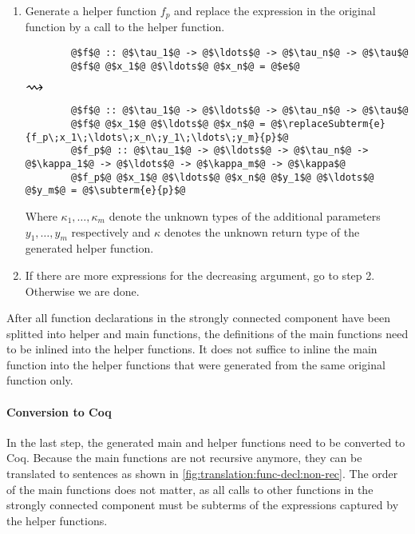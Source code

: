 \begin{enumerate}
  \item
  Generate a helper function $f_p$ and replace the  expression in the original function by a call to the helper function.
  \begin{center}
    \begin{minipage}[t]{0.3\textwidth}
      \begin{verbatim}
        @$f$@ :: @$\tau_1$@ -> @$\ldots$@ -> @$\tau_n$@ -> @$\tau$@
        @$f$@ @$x_1$@ @$\ldots$@ @$x_n$@ = @$e$@
      \end{verbatim}
    \end{minipage}
    \begin{minipage}[c]{0.05\textwidth}
      $\mathlarger{\mathlarger{\mathlarger{\rightsquigarrow}}}$
    \end{minipage}
    \begin{minipage}[t]{0.5\textwidth}
      \begin{verbatim}
        @$f$@ :: @$\tau_1$@ -> @$\ldots$@ -> @$\tau_n$@ -> @$\tau$@
        @$f$@ @$x_1$@ @$\ldots$@ @$x_n$@ = @$\replaceSubterm{e}{f_p\;x_1\;\ldots\;x_n\;y_1\;\ldots\;y_m}{p}$@
        @$f_p$@ :: @$\tau_1$@ -> @$\ldots$@ -> @$\tau_n$@ -> @$\kappa_1$@ -> @$\ldots$@ -> @$\kappa_m$@ -> @$\kappa$@
        @$f_p$@ @$x_1$@ @$\ldots$@ @$x_n$@ @$y_1$@ @$\ldots$@ @$y_m$@ = @$\subterm{e}{p}$@
      \end{verbatim}
    \end{minipage}
  \end{center}
  Where $\kappa_1, \ldots, \kappa_m$ denote the unknown types of the additional parameters $y_1, \ldots, y_m$ respectively and $\kappa$ denotes the unknown return type of the generated helper function.

  \item
  If there are more  expressions for the decreasing argument, go to step 2.
  Otherwise we are done.
\end{enumerate}

After all function declarations in the strongly connected component have been splitted into helper and main functions, the definitions of the main functions need to be inlined into the helper functions.
It does not suffice to inline the main function into the helper functions that were generated from the same original function only.

\paragraph{Conversion to Coq}
In the last step, the generated main and helper functions need to be converted to Coq.
Because the main functions are not recursive anymore, they can be translated to  sentences as shown in \autoref{fig:translation:func-decl:non-rec}.
The order of the main functions does not matter, as all calls to other functions in the strongly connected component must be subterms of the  expressions captured by the helper functions.

